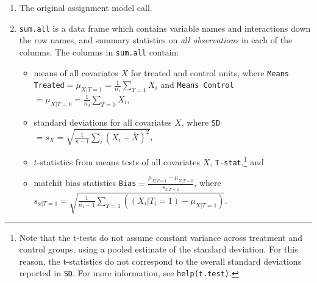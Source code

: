 \documentclass[oneside,letterpaper,titlepage]{article}
\begin{document}
\begin{enumerate}
\item The original assignment model call.
\item \texttt{sum.all} is a data frame which contains variable names
  and interactions down the row names, and summary statistics on
  \emph{all observations} in each of the columns.  The columns in
  \texttt{sum.all} contain:
  \begin{itemize}
  \item means of all covariates $X$ for treated and control units,
    where \texttt{Means Treated}$= \mu_{X|T=1} = \frac{1}{n_1}
    \sum_{T=1} X_i$ and \texttt{Means Control}$= \mu_{X|T=0} =
    \frac{1}{n_0} \sum_{T=0} X_i$,
  \item standard deviations for all covariates $X$, where
    \texttt{SD}$= s_X = \sqrt{\frac{1}{n-1} \sum_{i} (X_i -
      \overline{X})^2}$,
  \item $t$-statistics from means tests of all covariates $X$,
    \texttt{T-stat},\footnote{Note that the t-tests do not assume
      constant variance across treatment and control groups, using a
      pooled estimate of the standard deviation.  For this reason, the
      t-statistics do not correspond to the overall standard
      deviations reported in \texttt{SD}.  For more information, see
      \texttt{help(t.test)}.} and
  \item matchit bias statistics \texttt{Bias}$=\frac{\mu_{X|T=1} -
      \mu_{X|T=0}}{s_{x|T=1}}$, where $s_{x|T=1} =
    \sqrt{\frac{1}{n_1-1} \sum_{T=1} ( (X_i|T_i=1) - \mu_{X|T=1})}$.
  \end{itemize}
  

\end{enumerate}
\end{document}
